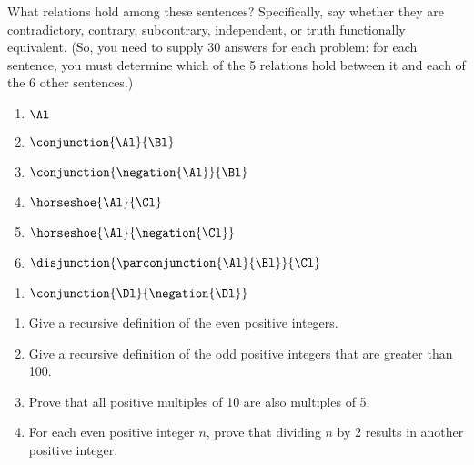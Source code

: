 
What relations hold among these sentences? Specifically, say whether they are contradictory, contrary, subcontrary, independent, or truth functionally equivalent. (So, you need to supply 30 answers for each problem: for each sentence, you must determine which of the 5 relations hold between it and each of the 6 other sentences.) 
\begin{multicols}{2}
\begin{enumerate}
\item {$\Al$}
\item {$\conjunction{\Al}{\Bl}$}
\item {$\conjunction{\negation{\Al}}{\Bl}$}
\item {$\horseshoe{\Al}{\Cl}$}
\item {$\horseshoe{\Al}{\negation{\Cl}}$}
\item {$\disjunction{\parconjunction{\Al}{\Bl}}{\Cl}$}
\end{enumerate}
\end{multicols}
\begin{enumerate}[start=7]
\item {$\conjunction{\Dl}{\negation{\Dl}}$}
\end{enumerate}



\begin{enumerate}
	\item Give a recursive definition of the even positive integers. 
	\item Give a recursive definition of the odd positive integers that are greater than 100. 
	\item Prove that all positive multiples of 10 are also multiples of 5.
	\item For each even positive integer $n$, prove that dividing $n$ by 2 results in another positive integer.
\end{enumerate}


